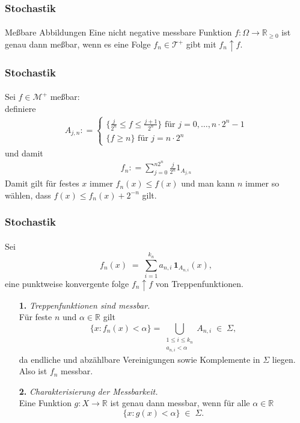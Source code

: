\documentclass{beamer}
\begin{document}
\begin{frame} 
    \frametitle{Stochastik}
\framesubtitle{}
    \begin{block}{Meßbare Abbildungen}
        Eine nicht negative messbare Funktion $f:\Omega \to \mathbb{R}_{\geq 0}$ ist genau dann meßbar, wenn
        es eine Folge $f_n \in \mathcal{T}^+$ gibt mit $f_n \uparrow f$.
    \end{block}

\end{frame}


\begin{frame}
    \frametitle{Stochastik}
\framesubtitle{}
Sei  $f \in \mathcal{M}^+$ meßbar: \\
definiere
\begin{align*}
    A_{j,n} : = \begin{cases} 
        \{ \frac{j}{2^n} \leq f \leq \frac{j+1}{2^n} \} \text{ für } j= 0, \dots, n \cdot 2^n -1 \\
        \{  f \geq n \} \text{ für } j= n \cdot 2^n 
    \end{cases}
\end{align*}
und damit 
\begin{align*}
    f_n : =  \sum_{j= 0}^{n2^n} \frac{j}{2^n} 1_{A_{j,n}}
\end{align*}
Damit gilt für festes $x$ immer $f_n(x) \leq f(x)$ und man kann $n$ immer so wählen, dass 
$ f(x) \leq f_n(x) +2^{-n}$ gilt.
\end{frame}

\begin{frame}
    \frametitle{Stochastik}
\framesubtitle{}
Sei 
\[
  f_n(x) \;=\; \sum_{i=1}^{k_n} a_{n,i}\,\mathbf{1}_{A_{n,i}}(x),
\]
 eine punktweise konvergente folge $f_n \uparrow f$ von Treppenfunktionen.

\begin{enumerate}
    \item[\textbf{1.}] \emph{Treppenfunktionen sind messbar.} \\
      Für feste $n$ und $\alpha\in\mathbb{R}$ gilt
      \[
        \{x: f_n(x)<\alpha\}
        = \bigcup_{\substack{1\le i\le k_n \\ a_{n,i}<\alpha}} A_{n,i}
        \;\in\;\Sigma,
      \]
      da endliche und abzählbare Vereinigungen sowie Komplemente in $\Sigma$ liegen. Also ist $f_n$ messbar.
  
    \item[\textbf{2.}] \emph{Charakterisierung der Messbarkeit.} \\
      Eine Funktion $g\colon X\to\mathbb{R}$ ist genau dann messbar, wenn für alle $\alpha\in\mathbb{R}$
      \[
        \{x:g(x)<\alpha\}\;\in\;\Sigma.
      \]
  
    
     
    \end{enumerate}
    \end{frame}
\end{document}
